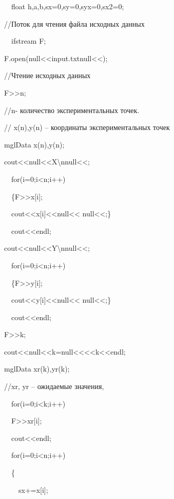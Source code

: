 {\upshape
\ \ float h,a,b,sx=0,sy=0,syx=0,sx2=0;}

{\upshape
//Поток для чтения файла исходных данных}

{\upshape
\ \ ifstream F;}

{\upshape
F.open(null{<<}input.txtnull{<<});}

{\upshape
//Чтение исходных данных}

{\upshape
F{\textgreater}{\textgreater}n;}

{\upshape
//n- количество экспериментальных точек.}

{\upshape
// x(n),y(n) – координаты экспериментальных точек}

{\upshape
mglData x(n),y(n);}

{\upshape
cout{\textless}{\textless}null{<<}X{\textbackslash}nnull{<<};}

{\upshape
\ \ for(i=0;i{\textless}n;i++)}

{\upshape
\ \ \{F{\textgreater}{\textgreater}x[i];}

{\upshape
\ \ cout{\textless}{\textless}x[i]{\textless}{\textless}null{<<} null{<<};\}}

{\upshape
\ \ cout{\textless}{\textless}endl;}

{\upshape
cout{\textless}{\textless}null{<<}Y{\textbackslash}nnull{<<};}

{\upshape
\ \ for(i=0;i{\textless}n;i++)}

{\upshape
\ \ \{F{\textgreater}{\textgreater}y[i];}

{\upshape
\ \ cout{\textless}{\textless}y[i]{\textless}{\textless}null{<<} null{<<};\}}

{\upshape
\ \ cout{\textless}{\textless}endl;}

{\upshape
F{\textgreater}{\textgreater}k;}

{\upshape
cout{\textless}{\textless}null{<<}k=null{<<}{\textless}{\textless}k{\textless}{\textless}endl;}

{\upshape
mglData xr(k),yr(k);}

{\upshape
//xr, yr – ожидаемые значения, }

{\upshape
\ \ for(i=0;i{\textless}k;i++)}

{\upshape
\ \ F{\textgreater}{\textgreater}xr[i];}

{\upshape
\ \ cout{\textless}{\textless}endl;}

{\upshape
\ \ for(i=0;i{\textless}n;i++)}

{\upshape
\ \ \{}

{\upshape
\ \ \ \ sx+=x[i];}

